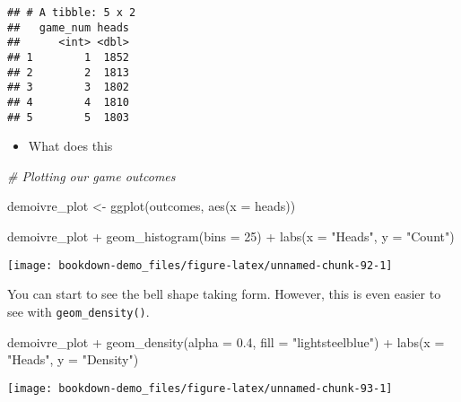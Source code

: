 \documentclass[
]{book}
\newenvironment{Shaded}{\begin{snugshade}}{\end{snugshade}}
\newcommand{\AttributeTok}[1]{\textcolor[rgb]{0.77,0.63,0.00}{#1}}
\newcommand{\CommentTok}[1]{\textcolor[rgb]{0.56,0.35,0.01}{\textit{#1}}}
\newcommand{\DecValTok}[1]{\textcolor[rgb]{0.00,0.00,0.81}{#1}}
\newcommand{\FloatTok}[1]{\textcolor[rgb]{0.00,0.00,0.81}{#1}}
\newcommand{\FunctionTok}[1]{\textcolor[rgb]{0.00,0.00,0.00}{#1}}
\newcommand{\NormalTok}[1]{#1}
\newcommand{\OtherTok}[1]{\textcolor[rgb]{0.56,0.35,0.01}{#1}}
\newcommand{\SpecialCharTok}[1]{\textcolor[rgb]{0.00,0.00,0.00}{#1}}
\newcommand{\StringTok}[1]{\textcolor[rgb]{0.31,0.60,0.02}{#1}}
\providecommand{\tightlist}{%
  \setlength{\itemsep}{0pt}\setlength{\parskip}{0pt}}
\begin{document}
\begin{verbatim}
## # A tibble: 5 x 2
##   game_num heads
##      <int> <dbl>
## 1        1  1852
## 2        2  1813
## 3        3  1802
## 4        4  1810
## 5        5  1803
\end{verbatim}

\begin{itemize}
\tightlist
\item
  What does this
\end{itemize}

\begin{Shaded}
\begin{Highlighting}[]
\CommentTok{\# Plotting our game outcomes}

\NormalTok{demoivre\_plot }\OtherTok{\textless{}{-}} \FunctionTok{ggplot}\NormalTok{(outcomes, }\FunctionTok{aes}\NormalTok{(}\AttributeTok{x =}\NormalTok{ heads))}
  
\NormalTok{demoivre\_plot }\SpecialCharTok{+}
  \FunctionTok{geom\_histogram}\NormalTok{(}\AttributeTok{bins =} \DecValTok{25}\NormalTok{) }\SpecialCharTok{+}
  \FunctionTok{labs}\NormalTok{(}\AttributeTok{x =} \StringTok{"Heads"}\NormalTok{, }\AttributeTok{y =} \StringTok{"Count"}\NormalTok{)}
\end{Highlighting}
\end{Shaded}

\begin{center}\texttt{[image: bookdown-demo\_files/figure-latex/unnamed-chunk-92-1]} \end{center}

You can start to see the bell shape taking form. However, this is even easier to see with \texttt{geom\_density()}.

\begin{Shaded}
\begin{Highlighting}[]
\NormalTok{demoivre\_plot }\SpecialCharTok{+}
  \FunctionTok{geom\_density}\NormalTok{(}\AttributeTok{alpha =} \FloatTok{0.4}\NormalTok{, }\AttributeTok{fill =} \StringTok{"lightsteelblue"}\NormalTok{) }\SpecialCharTok{+}
  \FunctionTok{labs}\NormalTok{(}\AttributeTok{x =} \StringTok{"Heads"}\NormalTok{, }\AttributeTok{y =} \StringTok{"Density"}\NormalTok{)}
\end{Highlighting}
\end{Shaded}

\begin{center}\texttt{[image: bookdown-demo\_files/figure-latex/unnamed-chunk-93-1]} \end{center}
\end{document}
